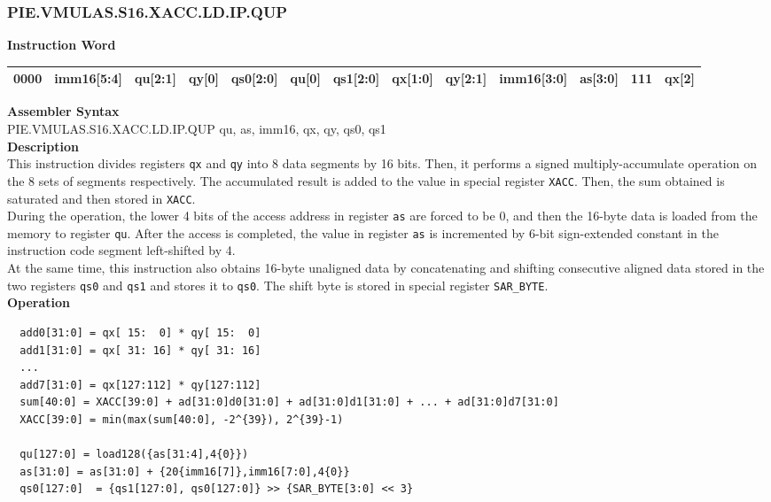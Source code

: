 \newpage
\subsubsection{PIE.VMULAS.S16.XACC.LD.IP.QUP}\label{instruction:PIEVMULASS16XACCLDIPQUP}
\setlength\tabcolsep{5pt}
\textbf{Instruction Word} \\
\begin{tabular}{|c|c|c|c|c|c|c|c|c|c|c|c|c|}
	\hline
	0000 & imm16[5:4] & qu[2:1] & qy[0] & qs0[2:0] & qu[0] & qs1[2:0] & qx[1:0] & qy[2:1] & imm16[3:0] & as[3:0] & 111 & qx[2] \\
	\hline
\end{tabular}

\textbf{Assembler Syntax} \\
PIE.VMULAS.S16.XACC.LD.IP.QUP qu, as, imm16, qx, qy, qs0, qs1 \\
\textbf{Description} \\
This instruction divides registers \lstinline{qx} and \lstinline{qy} into 8 data segments by 16 bits. Then, it performs a signed multiply-accumulate operation on the 8 sets of segments respectively. The accumulated result is added to the value in special register \lstinline{XACC}. Then, the sum obtained is saturated and then stored in \lstinline{XACC}.\\
During the operation, the lower 4 bits of the access address in register \lstinline{as} are forced to be 0, and then the 16-byte data is loaded from the memory to register \lstinline{qu}. After the access is completed, the value in register \lstinline{as} is incremented by 6-bit sign-extended constant in the instruction code segment left-shifted by 4.\\
At the same time, this instruction also obtains 16-byte unaligned data by concatenating and shifting consecutive aligned data stored in the two registers \lstinline{qs0} and \lstinline{qs1} and stores it to \lstinline{qs0}. The shift byte is stored in special register \lstinline{SAR_BYTE}.\\
\textbf{Operation}
\begin{lstlisting}
  add0[31:0] = qx[ 15:  0] * qy[ 15:  0]
  add1[31:0] = qx[ 31: 16] * qy[ 31: 16]
  ...
  add7[31:0] = qx[127:112] * qy[127:112]
  sum[40:0] = XACC[39:0] + ad[31:0]d0[31:0] + ad[31:0]d1[31:0] + ... + ad[31:0]d7[31:0]
  XACC[39:0] = min(max(sum[40:0], -2^{39}), 2^{39}-1)

  qu[127:0] = load128({as[31:4],4{0}})
  as[31:0] = as[31:0] + {20{imm16[7]},imm16[7:0],4{0}}
  qs0[127:0]  = {qs1[127:0], qs0[127:0]} >> {SAR_BYTE[3:0] << 3}
\end{lstlisting}

